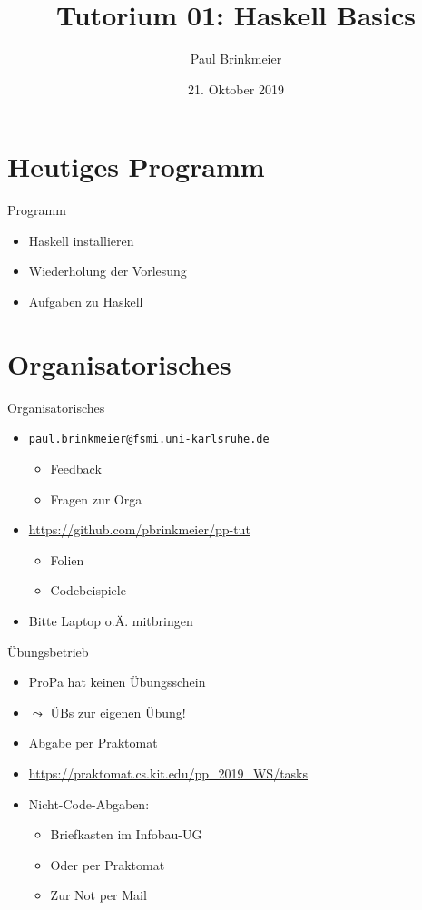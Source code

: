 \documentclass{beamer}
\title{Tutorium 01: Haskell Basics}
\author{Paul Brinkmeier}
\institute{Tutorium Programmierparadigmen am KIT}
\date{21. Oktober 2019}
\begin{document}
\begin{frame}
	\titlepage
\end{frame}

\section{Heutiges Programm}
\begin{frame}{Programm}
	\begin{itemize}
		\item Haskell installieren
		\item Wiederholung der Vorlesung
		\item Aufgaben zu Haskell
	\end{itemize}
\end{frame}

\section{Organisatorisches}

\begin{frame}{Organisatorisches}
	\begin{itemize}
		\item \texttt{paul.brinkmeier@fsmi.uni-karlsruhe.de}
		\begin{itemize}
			\item Feedback
			\item Fragen zur Orga
		\end{itemize}
		\item \url{https://github.com/pbrinkmeier/pp-tut}
		\begin{itemize}
			\item Folien
			\item Codebeispiele
		\end{itemize}
		\item Bitte Laptop o.Ä. mitbringen
	\end{itemize}
\end{frame}

\begin{frame}{Übungsbetrieb}
	\begin{itemize}
		\item ProPa hat keinen Übungsschein
		\item $\leadsto$ ÜBs zur eigenen Übung!
		\item Abgabe per Praktomat
		\item \url{https://praktomat.cs.kit.edu/pp_2019_WS/tasks}
		\item Nicht-Code-Abgaben:
		\begin{itemize}
			\item Briefkasten im Infobau-UG
			\item Oder per Praktomat
			\item Zur Not per Mail
		\end{itemize}
	\end{itemize}
\end{frame}
\end{document}
